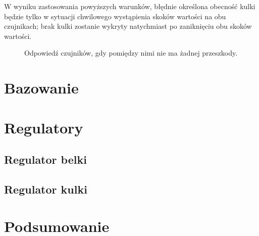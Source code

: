 W wyniku zastosowania powyższych warunków, błędnie określona obecność kulki będzie tylko w sytuacji chwilowego wystąpienia skoków wartości na obu czujnikach; brak kulki zostanie wykryty natychmiast po zaniknięciu obu skoków wartości.

\begin{figure}[ht]
    \centering
        
    \caption{Odpowiedź czujników, gdy pomiędzy nimi nie ma żadnej przeszkody.}
    \label{fig:czujniki_charakterystyka_bez_przeszkody}
\end{figure}

\section{Bazowanie}
\label{sec:ch7_bazowanie}


\section{Regulatory}
\label{sec:ch7_regulatory}


\subsection{Regulator belki}
\label{subsec:ch7_regulator_belki}


\subsection{Regulator kulki}
\label{subsec:ch7_regulator_kulki}


\section{Podsumowanie}

